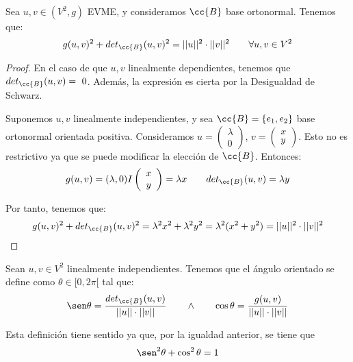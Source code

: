 \begin{lema} Sea $u,v\in (V^2,g)$ EVME, y consideramos $\cc{B}$ base ortonormal. Tenemos que:
\begin{equation*}
    g(u,v)^2+det_{\cc{B}}(u,v)^2 = ||u||^2 \cdot ||v||^2 \qquad \forall u,v\in V^2
\end{equation*}
\end{lema}
\begin{proof}
    En el caso de que $u,v$ linealmente dependientes, tenemos que $det_{\cc{B}}(u,v)=~0$. Además, la expresión es cierta por la Desigualdad de Schwarz.

    Suponemos $u,v$ linealmente independientes, y sea $\cc{B}=\{e_1, e_2\}$ base ortonormal orientada positiva. Consideramos $u=\left(\begin{array}{c}
        \lambda \\ 0
    \end{array}\right)$, $v=\left(\begin{array}{c}
        x \\ y
    \end{array}\right)$. Esto no es restrictivo ya que se puede modificar la elección de $\cc{B}$. Entonces:
    \begin{equation*}
        g(u,v) = (\lambda, 0)I\left(\begin{array}{c}
        x \\ y
    \end{array}\right)=\lambda x \qquad det_{\cc{B}}(u,v) = \lambda y
    \end{equation*}

    Por tanto, tenemos que:
    \begin{equation*}
        g(u,v)^2+det_{\cc{B}}(u,v)^2 = 
        \lambda^2 x^2 + \lambda^2 y^2 = \lambda ^2 (x^2 + y^2) = ||u||^2 \cdot ||v||^2
    \end{equation*}
\end{proof}

\begin{definicion}
    Sean $u,v\in V^2$ linealmente independientes. Tenemos que el ángulo orientado se define como $\theta \in [0,2\pi[$ tal que:
    \begin{equation*}
        \sen \theta = \frac{det_{\cc{B}}(u,v)}{||u||\cdot ||v||} \qquad \land \qquad 
        \cos \theta = \frac{g(u,v)}{||u||\cdot ||v||}
    \end{equation*}

    Esta definición tiene sentido ya que, por la igualdad anterior, se tiene que $$\sen^2  \theta + \cos^2 \theta =1$$
\end{definicion}


